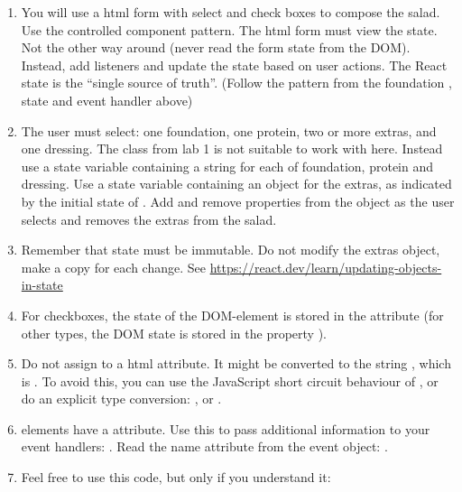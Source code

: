 \documentclass[fleqn, article, a4paper]{memoir}
\begin{document}
\begin{Assignments}
\begin{enumerate}
  \item You will use a html form with select and check boxes to compose the salad. Use the controlled component pattern. The html form must view the  state. Not the other way around (never read the form state from the DOM). Instead, add listeners and update the state based on user actions. The React state is the ``single source of truth''. (Follow the pattern from the foundation , state and event handler above)
  
  \item The user must select: one foundation, one protein, two or more extras, and one dressing. The  class from lab 1 is not suitable to work with here. Instead use a state variable containing a string for each of foundation, protein and dressing. Use a state variable containing an object for the extras, as indicated by the initial state of . Add and remove properties from the object as the user selects and removes the extras from the salad.

  \item Remember that state must be immutable. Do not modify the extras object, make a copy for each change. See \url{https://react.dev/learn/updating-objects-in-state}

  \item For checkboxes, the state of the DOM-element is stored in the attribute  (for other  types, the DOM state is stored in the property ).
  
  \item Do not assign  to a html attribute. It might be converted to the string , which is . To avoid this, you can use the JavaScript short circuit behaviour of \code{||} , or do an explicit type conversion: , or .

  \item {} elements have a  attribute. Use this to pass additional information to your event handlers:
  . Read the name  attribute from the event object: .

  \item Feel free to use this code, but only if you understand it: \\
  

\end{enumerate}
\end{Assignments}
\end{document}
